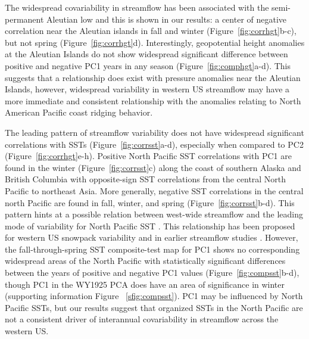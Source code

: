 \documentclass[final, double]{ua-thesis}
\begin{document}
The widespread covariability in streamflow has been associated with the semi-permanent Aleutian low \citep{1cayan_influence_1989, 1lins_regional_1997} and this is shown in our results: a center of negative correlation near the Aleutian islands in fall and winter (Figure~\ref{fig:corrhgt}b-c), but not spring (Figure~\ref{fig:corrhgt}d). Interestingly, geopotential height anomalies at the Aleutian Islands do not show widespread significant difference between positive and negative PC1 years in any season (Figure~\ref{fig:comphgt}a-d). This suggests that a relationship does exist with pressure anomalies near the Aleutian Islands, however, widespread variability in western US streamflow may have a more immediate and consistent relationship with the anomalies relating to North American Pacific coast ridging behavior.

The leading pattern of streamflow variability does not have widespread significant correlations with SSTs (Figure~\ref{fig:corrsst}a-d), especially when compared to PC2 (Figure~\ref{fig:corrhgt}e-h). Positive North Pacific SST correlations with PC1 are found in the winter (Figure~\ref{fig:corrsst}c) along the coast of southern Alaska and British Columbia with opposite-sign SST correlations from the central North Pacific to northeast Asia. More generally, negative SST correlations in the central north Pacific are found in fall, winter, and spring (Figure~\ref{fig:corrsst}b-d). This pattern hints at a possible relation between west-wide streamflow and the leading mode of variability for North Pacific SST \citep{1mantua_pacific_2002}. This relationship has been proposed for western US snowpack variability \citep{1mccabe_primary_2002} and in earlier streamflow studies \citep [e.g., ][]{1tootle_coupled_2005, 1tootle_relationships_2006, 1sagarika_pacific_2016}. However, the fall-through-spring SST composite-test map for PC1 shows no corresponding widespread areas of the North Pacific with statistically significant differences between the years of positive and negative PC1 values (Figure~\ref{fig:compsst}b-d), though PC1 in the WY1925 PCA does have an area of significance in winter (supporting information Figure ~\ref{sfig:compsst}). PC1 may be influenced by North Pacific SSTs, but our results suggest that organized SSTs in the North Pacific are not a consistent driver of interannual covariability in streamflow across the western US.
\end{document}
